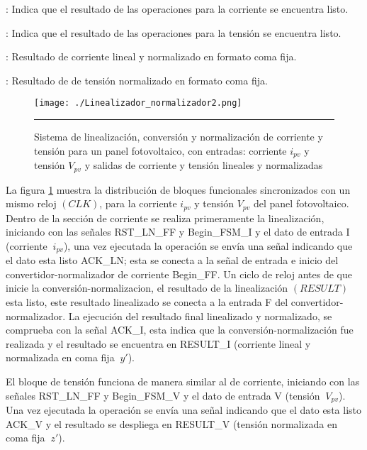 \begin{compactitem}

\item {}: Indica que el resultado de las operaciones para la corriente se encuentra listo.  
\item {}: Indica que el resultado de las operaciones para la tensión se encuentra listo.  
\item {}: Resultado de corriente lineal y normalizado en formato coma fija. 
\item {}: Resultado de de tensión normalizado en formato coma fija.

\end{compactitem}

\begin{figure}[H]
  \centering
    \texttt{[image: ./Linealizador\_normalizador2.png]}
    \rule{35em}{0.5pt}
  \caption[Sistema de linealización, conversión y normalización de corriente y tensión para un panel fotovoltaico, con entradas: corriente $i_{pv}$ y tensión $V_{pv}$ y salidas de corriente y tensión lineales y normalizadas]{Sistema de linealización, conversión y normalización de corriente y tensión para un panel fotovoltaico, con entradas: corriente $i_{pv}$ y tensión $V_{pv}$ y salidas de corriente y tensión lineales y normalizadas}
  \label{fig:Sist2}
\end{figure}

La figura \ref{fig:Sist2} muestra la distribución de bloques funcionales sincronizados con un mismo reloj $ \left(CLK\right)$, para la corriente $i_{pv}$ y tensión $V_{pv}$ del panel fotovoltaico. Dentro de la sección de corriente se realiza primeramente la linealización, iniciando con las señales RST\_LN\_FF y Begin\_FSM\_I y el dato de entrada I (corriente $\ i_{pv}$), una vez ejecutada la operación se envía una señal indicando que el dato esta listo ACK\_LN; esta se conecta a la señal de entrada e inicio del convertidor-normalizador de corriente Begin\_FF. Un ciclo de reloj antes de que inicie la conversión-normalizacion, el resultado de la linealización $ \left(RESULT\right)$ esta listo, este resultado linealizado se conecta a la entrada F del convertidor-normalizador. La ejecución del resultado final linealizado y normalizado, se comprueba con la señal ACK\_I, esta indica que la conversión-normalización fue realizada y el resultado se encuentra en RESULT\_I (corriente lineal y normalizada en coma fija  $\ y' $).    

El bloque de tensión funciona de manera similar al de corriente, iniciando con las señales RST\_LN\_FF y Begin\_FSM\_V y el dato de entrada V (tensión $\ V_{pv}$). Una vez ejecutada la operación se envía una señal indicando que el dato esta listo ACK\_V y el resultado se despliega en RESULT\_V (tensión normalizada en coma fija  $\ z' $).

